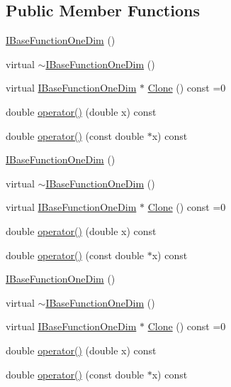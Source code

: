\subsection*{Public Member Functions}
\begin{DoxyCompactItemize}
\item 
\mbox{\hyperlink{classROOT_1_1Math_1_1IBaseFunctionOneDim_a52ca1f6207a3360d1bb00de0def69c3e}{I\+Base\+Function\+One\+Dim}} ()
\item 
virtual \mbox{\hyperlink{classROOT_1_1Math_1_1IBaseFunctionOneDim_a475922c2b1288b843d7bc7fae17b6ae2}{$\sim$\+I\+Base\+Function\+One\+Dim}} ()
\item 
virtual \mbox{\hyperlink{classROOT_1_1Math_1_1IBaseFunctionOneDim}{I\+Base\+Function\+One\+Dim}} $\ast$ \mbox{\hyperlink{classROOT_1_1Math_1_1IBaseFunctionOneDim_a656dbb4dfc43e8d1566442bfb1a717fd}{Clone}} () const =0
\item 
double \mbox{\hyperlink{classROOT_1_1Math_1_1IBaseFunctionOneDim_ac7f3be3ec5ab92d04ebb33f6615d59c2}{operator()}} (double x) const
\item 
double \mbox{\hyperlink{classROOT_1_1Math_1_1IBaseFunctionOneDim_ab99decfcf98d9b016322ebe85f4bc77a}{operator()}} (const double $\ast$x) const
\item 
\mbox{\hyperlink{classROOT_1_1Math_1_1IBaseFunctionOneDim_a52ca1f6207a3360d1bb00de0def69c3e}{I\+Base\+Function\+One\+Dim}} ()
\item 
virtual \mbox{\hyperlink{classROOT_1_1Math_1_1IBaseFunctionOneDim_a475922c2b1288b843d7bc7fae17b6ae2}{$\sim$\+I\+Base\+Function\+One\+Dim}} ()
\item 
virtual \mbox{\hyperlink{classROOT_1_1Math_1_1IBaseFunctionOneDim}{I\+Base\+Function\+One\+Dim}} $\ast$ \mbox{\hyperlink{classROOT_1_1Math_1_1IBaseFunctionOneDim_a656dbb4dfc43e8d1566442bfb1a717fd}{Clone}} () const =0
\item 
double \mbox{\hyperlink{classROOT_1_1Math_1_1IBaseFunctionOneDim_ac7f3be3ec5ab92d04ebb33f6615d59c2}{operator()}} (double x) const
\item 
double \mbox{\hyperlink{classROOT_1_1Math_1_1IBaseFunctionOneDim_ab99decfcf98d9b016322ebe85f4bc77a}{operator()}} (const double $\ast$x) const
\item 
\mbox{\hyperlink{classROOT_1_1Math_1_1IBaseFunctionOneDim_a52ca1f6207a3360d1bb00de0def69c3e}{I\+Base\+Function\+One\+Dim}} ()
\item 
virtual \mbox{\hyperlink{classROOT_1_1Math_1_1IBaseFunctionOneDim_a475922c2b1288b843d7bc7fae17b6ae2}{$\sim$\+I\+Base\+Function\+One\+Dim}} ()
\item 
virtual \mbox{\hyperlink{classROOT_1_1Math_1_1IBaseFunctionOneDim}{I\+Base\+Function\+One\+Dim}} $\ast$ \mbox{\hyperlink{classROOT_1_1Math_1_1IBaseFunctionOneDim_a656dbb4dfc43e8d1566442bfb1a717fd}{Clone}} () const =0
\item 
double \mbox{\hyperlink{classROOT_1_1Math_1_1IBaseFunctionOneDim_ac7f3be3ec5ab92d04ebb33f6615d59c2}{operator()}} (double x) const
\item 
double \mbox{\hyperlink{classROOT_1_1Math_1_1IBaseFunctionOneDim_ab99decfcf98d9b016322ebe85f4bc77a}{operator()}} (const double $\ast$x) const
\end{DoxyCompactItemize}


